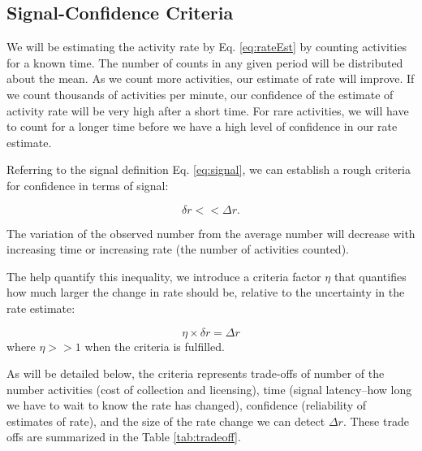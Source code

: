 \documentclass{article}
\begin{document}
\subsection{Signal-Confidence Criteria} %

We will be estimating the activity rate by Eq. \ref{eq:rateEst} by counting activities for a known time.  The number of counts in any given period will be distributed about the mean. As we count more activities, our estimate of rate will improve.  If we count thousands of activities per minute, our confidence of the estimate of activity rate will be very high after a short time.  For rare activities, we will have to count for a longer time before we have a high level of confidence in our rate estimate.

Referring to the signal definition Eq. \ref{eq:signal}, we can establish a rough criteria for confidence in terms of signal: 

\begin{equation}
    \label{eq:criteria}
    \delta r << \Delta r.
\end{equation}

The variation of the observed number from the average number will decrease with increasing time or increasing rate (the number of activities counted).

The help quantify this inequality, we introduce a criteria factor $\eta$ that quantifies how much larger the change in rate should be, relative to the uncertainty in the rate estimate:

\begin{equation}
    \label{eq:criteriaParam}
    \eta \times \delta r = \Delta r
\end{equation}
where $\eta >> 1$ when the criteria is fulfilled.

As will be detailed below, the criteria represents trade-offs of number of the number activities (cost of collection and licensing), time (signal latency--how long we have to wait to know the rate has changed), confidence (reliability of estimates of rate), and the size of the rate change we can detect $\Delta r$. These trade offs are summarized in the Table \ref{tab:tradeoff}.
\end{document}

